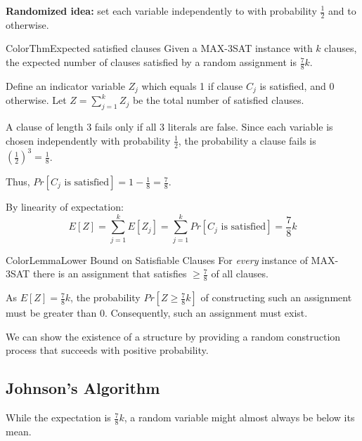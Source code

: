 \documentclass[a4paper, 11pt]{report}
\begin{document}
\textbf{Randomized idea:} set each variable independently to  with probability $\frac{1}{2}$ and to  otherwise.

\begin{cframe}{ColorThm}{Expected satisfied clauses}
    Given a MAX-3SAT instance with $k$ clauses, the expected number of clauses satisfied by a random assignment is $\frac{7}{8}k$.
\end{cframe}
    
\begin{proofframe}{}{}
    Define an indicator variable $Z_j$ which equals 1 if clause $C_j$ is satisfied, and 0 otherwise. 
    Let $Z = \sum_{j=1}^k Z_j$ be the total number of satisfied clauses.
    
    A clause of length 3 fails only if all 3 literals are false. Since each variable is chosen independently with probability $\frac{1}{2}$, the probability a clause fails is $\left(\frac{1}{2}\right)^3 = \frac{1}{8}$. 

    Thus, $Pr[C_j \text{ is satisfied}] = 1 - \frac{1}{8} = \frac{7}{8}$.
    
    By linearity of expectation:
    $$E[Z] = \sum_{j=1}^k E[Z_j] = \sum_{j=1}^k Pr[C_j \text{ is satisfied}] = \frac{7}{8}k$$
\end{proofframe}
\begin{cframe}{ColorLemma}{Lower Bound on Satisfiable Clauses}
    For \textit{every} instance of MAX-3SAT there is an assignment that satisfies $\ge \frac{7}{8}$ of all clauses.
    
\end{cframe}

\begin{proofframe}{}{}
As $E[Z] = \frac{7}{8}k$, the probability $Pr[Z \ge \frac{7}{8}k]$ of constructing such an assignment must be greater than 0. Consequently, such an assignment must exist. 
\begin{gframe}{}
     We can show the existence of a structure by providing a random construction process that succeeds with positive probability.
\end{gframe}

\end{proofframe}

\subsection{Johnson's Algorithm}

While the expectation is $\frac{7}{8}k$, a random variable might almost always be below its mean. 
\end{document}
